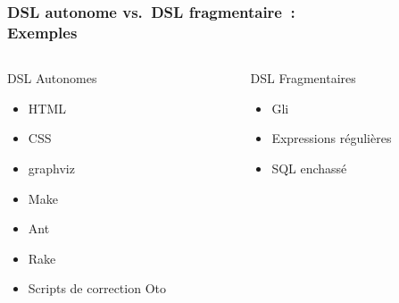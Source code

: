 \begin{frame}
\frametitle{DSL autonome vs.\ DSL fragmentaire~:\\Exemples}

\begin{columns}
\begin{column}{5cm}
\begin{block}{{DSL Autonomes}}
\begin{itemize}
\item HTML
\item CSS
\item graphviz
\item Make
\item Ant
\item Rake
\item Scripts de correction Oto
\end{itemize}	
\end{block}
\end{column}

\begin{column}{5cm}
\begin{block}{{DSL Fragmentaires}}
\begin{itemize}
\item Gli
\item Expressions r\'eguli\`eres
\item SQL enchass\'e
\end{itemize}
\end{block}
\end{column}
\end{columns}

\NOTE{\ }

\end{frame}


